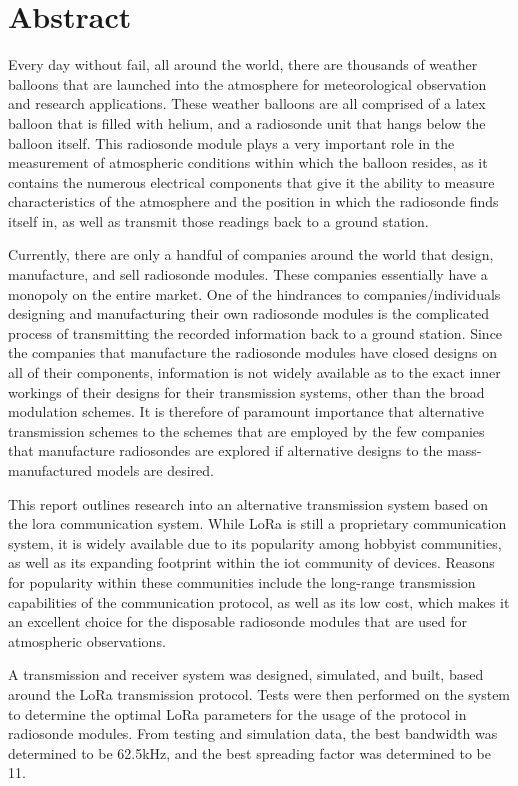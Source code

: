 {

\chapter*{Abstract}
Every day without fail, all around the world, there are thousands of weather balloons that are launched into the atmosphere for meteorological observation and research applications. These weather balloons are all comprised of a latex balloon that is filled with helium, and a radiosonde unit that hangs below the balloon itself. This radiosonde module plays a very important role in the measurement of atmospheric conditions within which the balloon resides, as it contains the numerous electrical components that give it the ability to measure characteristics of the atmosphere and the position in which the radiosonde finds itself in, as well as transmit those readings back to a ground station.

Currently, there are only a handful of companies around the world that design, manufacture, and sell radiosonde modules. These companies essentially have a monopoly on the entire market. One of the hindrances to companies/individuals designing and manufacturing their own radiosonde modules is the complicated process of transmitting the recorded information back to a ground station. Since the companies that manufacture the radiosonde modules have closed designs on all of their components, information is not widely available as to the exact inner workings of their designs for their transmission systems, other than the broad modulation schemes. It is therefore of paramount importance that alternative transmission schemes to the schemes that are employed by the few companies that manufacture radiosondes are explored if alternative designs to the mass-manufactured models are desired.

This report outlines research into an alternative transmission system based on the \gls{lora} communication system. While LoRa is still a proprietary communication system, it is widely available due to its popularity among hobbyist communities, as well as its expanding footprint within the \gls{iot} community of devices. Reasons for popularity within these communities include the long-range transmission capabilities of the communication protocol, as well as its low cost, which makes it an excellent choice for the disposable radiosonde modules that are used for atmospheric observations.

A transmission and receiver system was designed, simulated, and built, based around the LoRa transmission protocol. Tests were then performed on the system to determine the optimal LoRa parameters for the usage of the protocol in radiosonde modules. From testing and simulation data, the best bandwidth was determined to be 62.5kHz, and the best spreading factor was determined to be 11. 

}